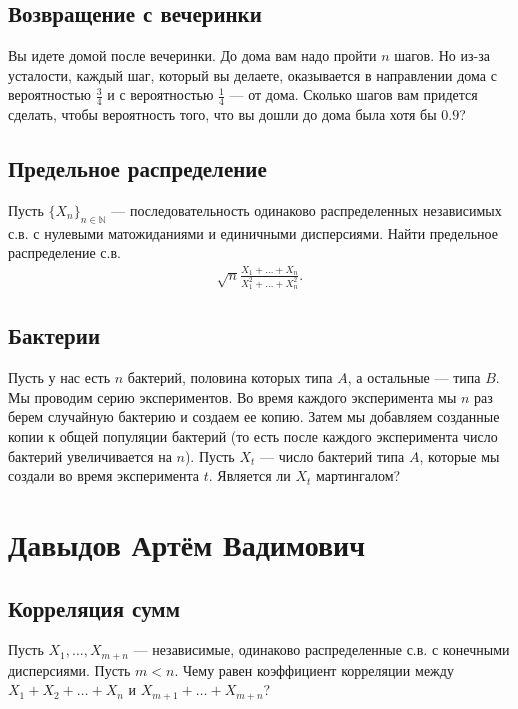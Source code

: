 \documentclass[12pt]{article}
\newcommand\N{\mathbb{N}}
\begin{document}
\subsection{Возвращение с вечеринки}

Вы идете домой после вечеринки. До дома вам надо пройти $n$ шагов. Но из-за усталости, каждый шаг, который вы делаете, оказывается в направлении дома с вероятностью $\frac{3}{4}$ и с вероятностью $\frac{1}{4}$ --- от дома. Сколько шагов вам придется сделать, чтобы вероятность того, что вы дошли до дома была хотя бы $0.9$?

\subsection{Предельное распределение}

Пусть $\{X_n\}_{n \in \N}$ --- последовательность одинаково распределенных независимых с.в. с нулевыми матожиданиями и единичными дисперсиями. Найти предельное распределение с.в.
\begin{align*}
    \sqrt{n}\frac{X_1 + \dots + X_n}{X_1^2 + \dots + X_n^2}.
\end{align*}

\subsection{Бактерии}

Пусть у нас есть $n$ бактерий, половина которых типа $A$, а остальные --- типа $B$. Мы проводим серию экспериментов. Во время каждого эксперимента мы $n$ раз берем случайную бактерию и создаем ее копию. Затем мы добавляем созданные копии к общей популяции бактерий (то есть после каждого эксперимента число бактерий увеличивается на $n$). Пусть $X_t$ --- число бактерий типа $A$, которые мы создали во время эксперимента $t$. Является ли $X_t$ мартингалом?


\newpage
\section{Давыдов Артём Вадимович}

\subsection{Корреляция сумм}

Пусть $X_1, \dots, X_{m + n}$ --- независимые, одинаково распределенные с.в. с конечными дисперсиями. Пусть $m < n$. Чему равен коэффициент корреляции между $X_1 + X_2 + \dots + X_n$ и $X_{m + 1} + \dots + X_{m + n}$?
\end{document}
